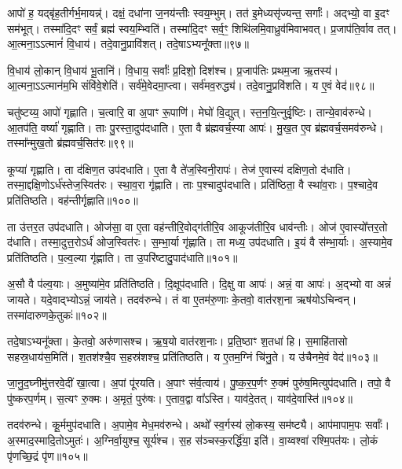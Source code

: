 आपो॑ ह॒ यद्बृ॑ह॒तीर्गर्भ॒मायन्न्॑। दक्षं॒ दधा॑ना ज॒नय॑न्तीः स्वय॒म्भुम्। 
तत॑ इ॒मेध्यसृ॑ज्यन्त॒ सर्गाः᳚। अद्भ्यो॒ वा इ॒दꣳ सम॑भूत्। 
तस्मा॑दि॒दꣳ सर्वं॒ ब्रह्म॑ स्वय॒म्भ्विति॑। 
तस्मा॑दि॒दꣳ सर्व॒ꣳ॒ शिथि॑लमि॒वा\-ध्रुव॑मिवाभवत्। 
प्र॒जाप॑ति॒र्वाव तत्। आ॒त्मना॒\-ऽऽत्मानं॑ वि॒धाय॑। 
तदे॒वानु॒प्रावि॑शत्। तदे॒षा\-ऽभ्यनू᳚क्ता॥९७॥\ip


वि॒धाय॑ लो॒कान्‌ वि॒धाय॑ भू॒तानि॑। वि॒धाय॒ सर्वाः᳚ प्र॒दिशो॒ दिश॑श्च। 
प्र॒जाप॑तिः प्रथम॒जा ऋ॒तस्य॑। आ॒त्मना॒\-ऽऽत्मान॑म॒भि संवि॑वे॒शेति॑। 
सर्व॑मे॒वेदमा॒प्त्वा। सर्व॑मव॒रुद्ध्य॑। 
तदे॒वानु॒प्रवि॑शति। य ए॒वं वेद॑॥९८॥\ip\anuvakamend


चतु॑ष्टय्य॒ आपो॑ गृह्णाति। च॒त्वारि॒ वा अ॒पाꣳ रू॒पाणि॑। 
मेघो॑ वि॒द्युत्। स्त॒न॒यि॒त्नुर्वृ॒ष्टिः। तान्ये॒वाव॑रुन्धे। 
आ॒तप॑ति॒ वर्ष्या॑ गृह्णाति। ताः पु॒रस्ता॒दुप॑दधाति। 
ए॒ता वै ब्र॑ह्मवर्च॒स्या आपः॑। मु॒ख॒त ए॒व ब्र॑ह्मवर्च॒समव॑रुन्धे। 
तस्मा᳚न्मुख॒तो ब्र॑ह्मवर्च॒सित॑रः॥९९॥\ip


कूप्या॑ गृह्णाति। ता द॑क्षिण॒त उप॑दधाति। 
ए॒ता वै ते॑ज॒स्विनी॒रापः॑। तेज॑ ए॒वास्य॑ दक्षिण॒तो द॑धाति। 
तस्मा॒द्दक्षि॒णो\-ऽर्ध॑स्तेज॒\-स्वित॑रः। स्था॒व॒रा गृ॑ह्णाति। 
ताः प॒श्चादुप॑दधाति। प्रति॑ष्ठिता॒ वै स्था॑व॒राः। 
प॒श्चादे॒व प्रति॑तिष्ठति। वह॑न्तीर्गृह्णाति॥१००॥\ip


ता उ॑त्तर॒त उप॑दधाति। ओज॑सा॒ वा ए॒ता वह॑न्तीरि॒वोद्ग॑तीरि॒व आकूज॑तीरि॒व धाव॑न्तीः। 
ओज॑ ए॒वास्यो᳚त्तर॒तो द॑धाति। तस्मा॒दुत्त॒रो\-ऽर्ध॑ ओज॒स्वित॑रः। 
स॒म्भा॒र्या गृ॑ह्णाति। ता मध्य॒ उप॑दधाति। 
इ॒यं वै स॑म्भा॒र्याः। अ॒स्यामे॒व प्रति॑तिष्ठति। 
प॒ल्व॒ल्या गृ॑ह्णाति। ता उ॒परि॑ष्टादु॒पाद॑धाति॥१०१॥\ip


अ॒सौ वै प॑ल्व॒याः। अ॒मुष्या॑मे॒व प्रति॑तिष्ठति। 
दि॒क्षूप॑दधाति। दि॒क्षु वा आपः॑। 
अन्नं॒ वा आपः॑। अ॒द्भ्यो वा अन्नं॑ जायते। 
यदे॒वाद्भ्यो\-ऽन्नं॒ जाय॑ते। तदव॑रुन्धे। 
तं वा ए॒तम॑रु॒णाः के॒तवो॒ वात॑रश॒ना ऋष॑यो\-ऽचिन्वन्। 
तस्मा॑दारुणके॒तुकः॑॥१०२॥\ip


तदे॒षा\-ऽभ्यनू᳚क्ता। के॒तवो॒ अरु॑णासश्च। 
ऋ॒ष॒यो वात॑रश॒नाः। प्र॒ति॒ष्ठाꣳ श॒तधा॑ हि। 
स॒माहि॑तासो सहस्र॒धाय॑स॒मिति॑। श॒तश॑श्चै॒व स॒हस्र॑शश्च॒ प्रति॑तिष्ठति। 
य ए॒तम॒ग्निं चि॑नु॒ते। य उ॑चैनमे॒वं वेद॑॥१०३॥\ip\anuvakamend


जा॒नु॒द॒घ्नीमु॑त्तरवे॒दीं खा॒त्वा। अ॒पां पू॑रयति। 
अ॒पाꣳ स॑र्व॒त्वाय॑। पु॒ष्क॒र॒प॒र्णꣳ रु॒क्मं पुरु॑ष॒मित्युप॑दधाति। 
तपो॒ वै पु॑ष्करप॒र्णम्। स॒त्यꣳ रु॒क्मः। 
अ॒मृतं॒ पुरु॑षः। ए॒ताव॒द्वा वा᳚\-ऽस्ति। 
याव॑दे॒तत्। याव॑दे॒वास्ति॑॥१०४॥\ip


तदव॑रुन्धे। कू॒र्ममुप॑दधाति। 
अ॒पामे॒व मेध॒मव॑रुन्धे। अथो᳚ स्व॒र्गस्य॑ लो॒कस्य॒ सम॑ष्ट्यै। 
आप॑मापाम॒पः सर्वाः᳚। अ॒स्मा\-द॒स्मा\-दि॒तो\-ऽमुतः॑। 
अ॒ग्निर्वा॒युश्च॒ सूर्य॑श्च। स॒ह स॑ञ्चस्क॒रर्द्धि॑या॒ इति॑। 
वा॒य्वश्वा॑ रश्मि॒पत॑यः। लो॒कं पृ॑णच्छि॒द्रं पृ॑ण॥१०५॥\ip


